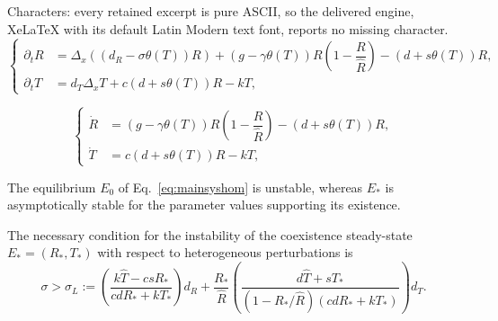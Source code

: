 \documentclass[10pt,a4paper]{amsart}
\begin{document}
Characters: every retained excerpt is pure ASCII, so the delivered engine, XeLaTeX with its default Latin Modern text font, reports no missing character.
\begin{equation} \label{eq:mainsys}
\begin{cases}
\partial_t R&= \Delta_x \left(\left(d_R -\sigma \theta(T)\right)R\right)
+\left(g-\gamma \theta(T)\right)R\left(1-\dfrac{R}{\hat{R}}\right)
-\left(d+s\theta(T)\right)R,\\[0.3cm]
\partial_t T&= d_T \Delta_x T +c\left(d+s\theta(T)\right)R-kT,
\end{cases}
\end{equation}

\begin{equation} \label{eq:mainsyshom}
\begin{cases}
 \dot{R}&= 
\left(g-\gamma \theta(T)\right)R\left(1-\dfrac{R}{\hat{R}}\right)
-\left(d+s\theta(T)\right)R,\\[0.3cm]
\dot{T}&= c\left(d+s\theta(T)\right)R-kT,   
\end{cases}
\end{equation}

\begin{prop} \label{prop:stabhom}
    The equilibrium $E_0$ of Eq.~\eqref{eq:mainsyshom} is unstable, whereas $E_*$ is asymptotically stable for the parameter values supporting its existence.
\end{prop}

\begin{prop} \label{prop:stabcross}
    The necessary condition for the instability of the coexistence steady-state ${E_*=(R_*,T_*)}$ with respect to heterogeneous perturbations is
    \begin{equation} \label{eq:condTur}
    \sigma > \sigma_L:=
    \left(\dfrac{k\hat{T}-csR_*}{cdR_*+kT_*}\right)d_R 
    + \dfrac{R_*}{\hat{R}}\left(\dfrac{d\hat{T}+sT_*}{(1-R_*/\hat{R})(cdR_*+kT_*)} \right)d_T.
\end{equation}
\end{prop}
\end{document}
